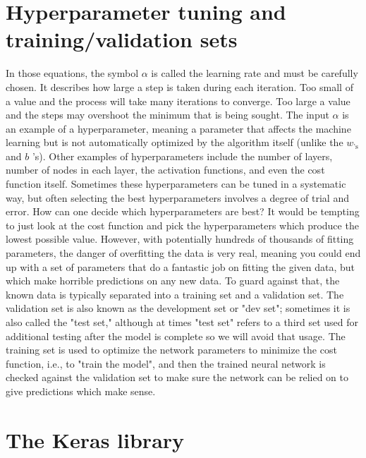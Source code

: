 \documentclass{book}
\theoremstyle{plain}
\theoremstyle{definition}
\numberwithin{exm}{chapter}
\theoremstyle{remark}
\theoremstyle{summary}
\theoremstyle{overview}
\begin{document}
\section*{Hyperparameter tuning and training/validation sets}
In those equations, the symbol $\alpha$ is called the learning rate and must be carefully chosen. It describes how large a step is taken during each iteration. Too small of a value and the process will take many iterations to converge. Too large a value and the steps may overshoot the minimum that is being sought. The input $\alpha$ is an example of a hyperparameter, meaning a parameter that affects the machine learning but is not automatically optimized by the algorithm itself (unlike the $w_{\text {'s }}$ and $b$ 's). Other examples of hyperparameters include the number of layers, number of nodes in each layer, the activation functions, and even the cost function itself. Sometimes these hyperparameters can be tuned in a systematic way, but often selecting the best hyperparameters involves a degree of trial and error.
How can one decide which hyperparameters are best? It would be tempting to just look at the cost function and pick the hyperparameters which produce the lowest possible value. However, with potentially hundreds of thousands of fitting parameters, the danger of overfitting the data is very real, meaning you could end up with a set of parameters that do a fantastic job on fitting the given data, but which make horrible predictions on any new data. To guard against that, the known data is typically separated into a training set and a validation set. The validation set is also known as the development set or "dev set"; sometimes it is also called the "test set," although at times "test set" refers to a third set used  for additional testing after the model is complete so we will avoid that usage. The training set is used to optimize the network parameters to minimize the cost function, i.e., to "train the model", and then the trained neural network is checked against the validation set to make sure the network can be relied on to give predictions which make sense.

\section*{The Keras library}
\end{document}
